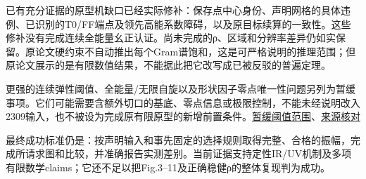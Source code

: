 \documentclass[
  10pt,
  a4paper,
]{article}
\begin{document}
已有充分证据的原型机缺口已经实际修补：保存点中心身份、声明网格的具体违例、已识别的T0/FF端点及领先高能系数障碍，以及原目标续算的一致性。这些修补没有完成连续全能量幺正认证。尚未完成的ρ、区域和分辨率差异仍如实保留。原论文硬约束不自动推出每个Gram谱饱和，这是可严格说明的推理范围；但原论文展示的是有限数值结果，不能据此把它改写成已被反驳的普遍定理。

更强的连续弹性阈值、全能量/无限自旋以及形状因子零点唯一性问题另列为暂缓事项。它们可能需要含额外切口的基底、零点信息或极限控制，不能未经说明改入2309输入，也不被设为完成原有限原型的新增前置条件。\href{../../../evidence/FINITE_FAMILY_INELASTIC_THRESHOLD_SCOPE_20260911.md}{暂缓阈值范围}、\href{../FOLLOWUP_SOURCE_CHECK_ZH.md}{来源核对}

最终成功标准仍是：按声明输入和事先固定的选择规则取得完整、合格的振幅，完成所请求图和比较，并准确报告实测差别。当前证据支持定性IR/UV机制及多项有限数学claims；它还不足以把Fig.3--11及正确稳健ρ的整体复现判为成功。
\end{document}
